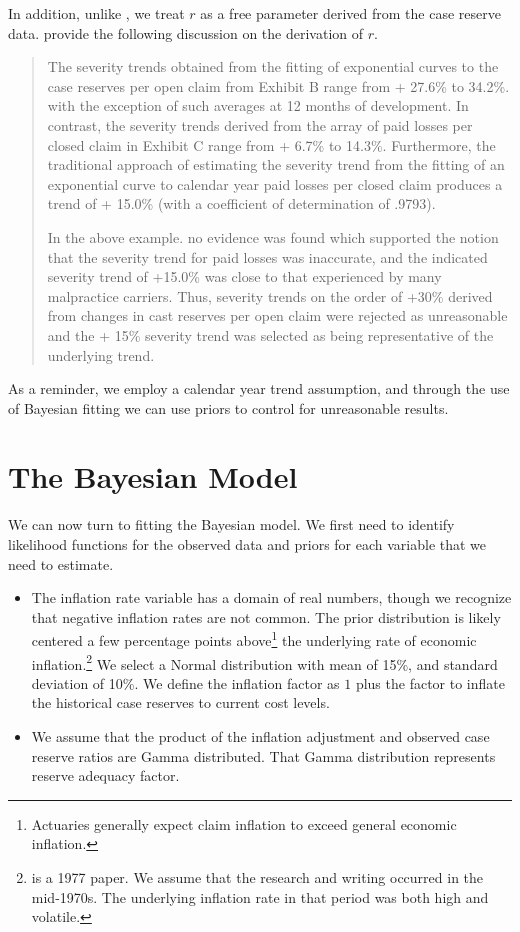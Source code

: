\documentclass[
  letterpaper,
  DIV=11,
  numbers=noendperiod]{scrartcl}
\begin{document}
In addition, unlike \bs, we treat \(r\) as a free parameter derived from
the case reserve data. \bs provide the following discussion on the
derivation of \(r\).

\begin{quote}
The severity trends obtained from the fitting of exponential curves to
the case reserves per open claim from Exhibit B range from + 27.6\% to
34.2\%. with the exception of such averages at 12 months of development.
In contrast, the severity trends derived from the array of paid losses
per closed claim in Exhibit C range from + 6.7\% to 14.3\%. Furthermore,
the traditional approach of estimating the severity trend from the
fitting of an exponential curve to calendar year paid losses per closed
claim produces a trend of + 15.0\% (with a coefficient of determination
of .9793).

In the above example. no evidence was found which supported the notion
that the severity trend for paid losses was inaccurate, and the
indicated severity trend of +15.0\% was close to that experienced by
many malpractice carriers. Thus, severity trends on the order of +30\%
derived from changes in cast reserves per open claim were rejected as
unreasonable and the + 15\% severity trend was selected as being
representative of the underlying trend.
\end{quote}

As a reminder, we employ a calendar year trend assumption, and through
the use of Bayesian fitting we can use priors to control for
unreasonable results.

\section{The Bayesian Model}\label{the-bayesian-model}

We can now turn to fitting the Bayesian model. We first need to identify
likelihood functions for the observed data and priors for each variable
that we need to estimate.

\begin{itemize}
\item
  The inflation rate variable has a domain of real numbers, though we
  recognize that negative inflation rates are not common. The prior
  distribution is likely centered a few percentage points
  above\footnote{Actuaries generally expect claim inflation to exceed
    general economic inflation.} the underlying rate of economic
  inflation.\footnote{\bs is a 1977 paper. We assume that the research
    and writing occurred in the mid-1970s. The underlying inflation rate
    in that period was both high and volatile.} We select a Normal
  distribution with mean of 15\%, and standard deviation of 10\%. We
  define the inflation factor as \(1\) plus the factor to inflate the
  historical case reserves to current cost levels.
\item
  We assume that the product of the inflation adjustment and observed
  case reserve ratios are Gamma distributed. That Gamma distribution
  represents reserve adequacy factor.
\end{itemize}
\end{document}
